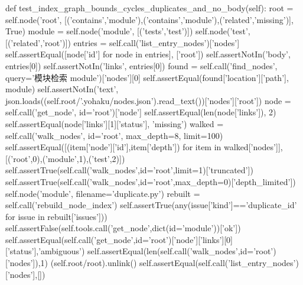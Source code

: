     def test_index_graph_bounds_cycles_duplicates_and_no_body(self):
        root = self.node('root', [('contains','module'),('contains','module'),('related','missing')], True)
        module = self.node('module', [('tests','test')])
        self.node('test', [('related','root')])
        entries = self.call('list_entry_nodes')['nodes']
        self.assertEqual([node['id'] for node in entries], ['root'])
        self.assertNotIn('body', entries[0])
        self.assertNotIn('links', entries[0])
        found = self.call('find_nodes', query='模块检索 module')['nodes'][0]
        self.assertEqual(found['location']['path'], module)
        self.assertNotIn('text', json.loads((self.root/'.yohaku/nodes.json').read_text())['nodes']['root'])
        node = self.call('get_node', id='root')['node']
        self.assertEqual(len(node['links']), 2)
        self.assertEqual(node['links'][1]['status'], 'missing')
        walked = self.call('walk_nodes', id='root', max_depth=8, limit=100)
        self.assertEqual([(item['node']['id'],item['depth']) for item in walked['nodes']], [('root',0),('module',1),('test',2)])
        self.assertTrue(self.call('walk_nodes',id='root',limit=1)['truncated'])
        self.assertTrue(self.call('walk_nodes',id='root',max_depth=0)['depth_limited'])
        self.node('module', filename='duplicate.py')
        rebuilt = self.call('rebuild_node_index')
        self.assertTrue(any(issue['kind']=='duplicate_id' for issue in rebuilt['issues']))
        self.assertFalse(self.tools.call('get_node',dict(id='module'))['ok'])
        self.assertEqual(self.call('get_node',id='root')['node']['links'][0]['status'],'ambiguous')
        self.assertEqual(len(self.call('walk_nodes',id='root')['nodes']),1)
        (self.root/root).unlink()
        self.assertEqual(self.call('list_entry_nodes')['nodes'],[])

